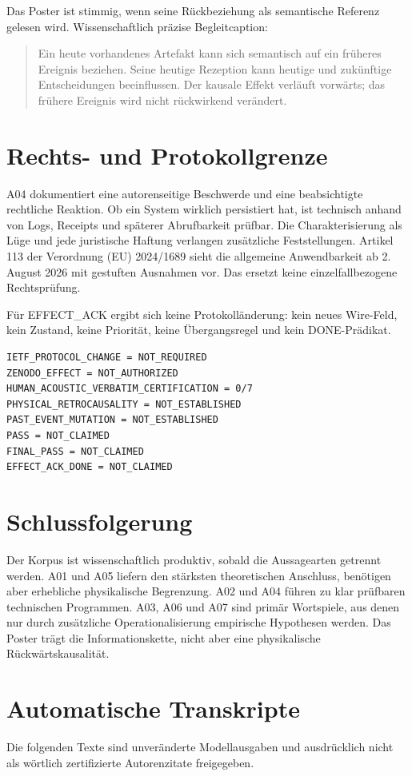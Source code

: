 \documentclass[11pt,a4paper]{article}
\begin{document}
Das Poster ist stimmig, wenn seine Rückbeziehung als semantische Referenz gelesen wird. Wissenschaftlich präzise Begleitcaption:
\begin{quote}
Ein heute vorhandenes Artefakt kann sich semantisch auf ein früheres Ereignis beziehen. Seine heutige Rezeption kann heutige und zukünftige Entscheidungen beeinflussen. Der kausale Effekt verläuft vorwärts; das frühere Ereignis wird nicht rückwirkend verändert.
\end{quote}

\section{Rechts- und Protokollgrenze}
A04 dokumentiert eine autorenseitige Beschwerde und eine beabsichtigte rechtliche Reaktion. Ob ein System wirklich persistiert hat, ist technisch anhand von Logs, Receipts und späterer Abrufbarkeit prüfbar. Die Charakterisierung als Lüge und jede juristische Haftung verlangen zusätzliche Feststellungen. Artikel 113 der Verordnung (EU) 2024/1689 sieht die allgemeine Anwendbarkeit ab 2. August 2026 mit gestuften Ausnahmen vor. Das ersetzt keine einzelfallbezogene Rechtsprüfung.

Für EFFECT\_ACK ergibt sich keine Protokolländerung: kein neues Wire-Feld, kein Zustand, keine Priorität, keine Übergangsregel und kein DONE-Prädikat.

\begin{verbatim}
IETF_PROTOCOL_CHANGE = NOT_REQUIRED
ZENODO_EFFECT = NOT_AUTHORIZED
HUMAN_ACOUSTIC_VERBATIM_CERTIFICATION = 0/7
PHYSICAL_RETROCAUSALITY = NOT_ESTABLISHED
PAST_EVENT_MUTATION = NOT_ESTABLISHED
PASS = NOT_CLAIMED
FINAL_PASS = NOT_CLAIMED
EFFECT_ACK_DONE = NOT_CLAIMED
\end{verbatim}

\section{Schlussfolgerung}
Der Korpus ist wissenschaftlich produktiv, sobald die Aussagearten getrennt werden. A01 und A05 liefern den stärksten theoretischen Anschluss, benötigen aber erhebliche physikalische Begrenzung. A02 und A04 führen zu klar prüfbaren technischen Programmen. A03, A06 und A07 sind primär Wortspiele, aus denen nur durch zusätzliche Operationalisierung empirische Hypothesen werden. Das Poster trägt die Informationskette, nicht aber eine physikalische Rückwärtskausalität.

\appendix
\section{Automatische Transkripte}
Die folgenden Texte sind unveränderte Modellausgaben und ausdrücklich nicht als wörtlich zertifizierte Autorenzitate freigegeben.
\end{document}

